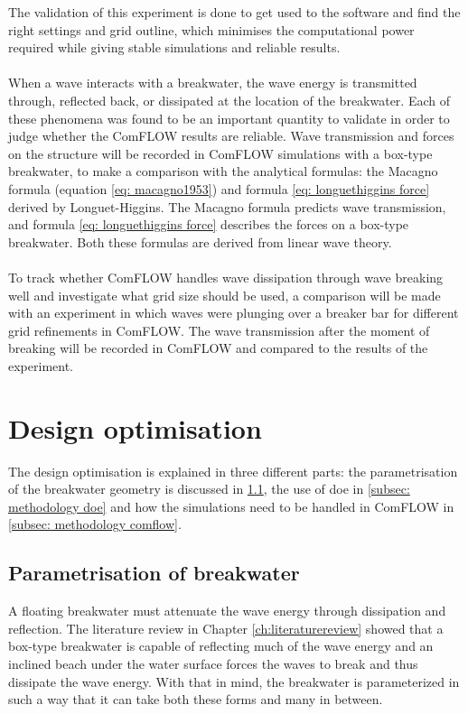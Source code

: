 The validation of this experiment is done to get used to the software and find the right settings and grid outline, which minimises the computational power required while giving stable simulations and reliable results.\\
\\
When a wave interacts with a breakwater, the wave energy is transmitted through, reflected back, or dissipated at the location of the breakwater. Each of these phenomena was found to be an important quantity to validate in order to judge whether the ComFLOW results are reliable. Wave transmission and forces on the structure will be recorded in ComFLOW simulations with a box-type breakwater, to make a comparison with the analytical formulas: the Macagno formula (equation \ref{eq: macagno1953}) and formula \ref{eq: longuethiggins force} derived by Longuet-Higgins. The Macagno formula predicts wave transmission, and formula \ref{eq: longuethiggins force} describes the forces on a box-type breakwater. Both these formulas are derived from linear wave theory.\\
\\
To track whether ComFLOW handles wave dissipation through wave breaking well and investigate what grid size should be used, a comparison will be made with an experiment in which waves were plunging over a breaker bar for different grid refinements in ComFLOW. The wave transmission after the moment of breaking will be recorded in ComFLOW and compared to the results of the experiment. 



\section{Design optimisation}
\label{sec: methodology design optimisation}
The design optimisation is explained in three different parts: the parametrisation of the breakwater geometry is discussed in \ref{subsec: methodology parametrisation}, the use of \acrfull{doe} in \ref{subsec: methodology doe} and how the simulations need to be handled in ComFLOW in \ref{subsec: methodology comflow}.

\subsection{Parametrisation of breakwater}
\label{subsec: methodology parametrisation}
A floating breakwater must attenuate the wave energy through dissipation and reflection. The literature review in Chapter \ref{ch:literaturereview} showed that a box-type breakwater is capable of reflecting much of the wave energy and an inclined beach under the water surface forces the waves to break and thus dissipate the wave energy. With that in mind, the breakwater is parameterized in such a way that it can take both these forms and many in between. 


